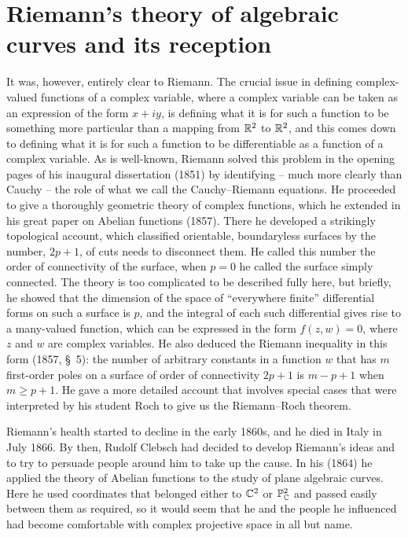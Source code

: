 \section{Riemann's theory of algebraic curves and its reception}
It was, however, entirely clear to Riemann. The crucial issue in defining complex-valued functions of a complex variable, where a complex variable can be taken as an expression of the form $x+ iy$, is defining what it is for such a function to be something more particular than a mapping from $\RR^2$ to $\RR^2$, and this comes down to defining what it is for such a function to be differentiable as a function of a complex variable. As is well-known, Riemann solved this problem in the opening pages of his inaugural dissertation  (1851) by identifying -- much more clearly than Cauchy -- the role of what we call the Cauchy--Riemann equations. He proceeded to give a thoroughly geometric theory of complex functions, which he extended in his great paper on Abelian functions (1857). There he developed a strikingly topological account, which classified orientable, boundaryless surfaces by the number, $2p+1$, of cuts needs to disconnect them. He called this number the order of connectivity of the surface, when $p=0$ he called the surface simply connected. The theory is too complicated to be described fully here, but briefly, he showed that  the dimension of the space of ``everywhere finite'' differential forms on such a surface is $p$, and the integral of each such 
differential gives rise to a many-valued function, which can be expressed in the form $f(z, w) = 0$, where $z$ and $w$ are complex variables. He also deduced the Riemann inequality in this form (1857, \S\, 5):  the number of arbitrary constants in a function $w$ that has $m$ first-order poles on a surface of order of connectivity $2p+1$ is $m- p + 1$ when $m \geq p + 1$. He gave a more detailed account that involves special cases that were interpreted by his student Roch to give us the Riemann--Roch theorem. 

Riemann's health started to decline in the early 1860s, and he  died in Italy in July 1866. By then, Rudolf Clebsch had decided to develop Riemann's ideas and to try to persuade people around him to take up the cause. In his (1864) he  applied the theory of Abelian functions to the study of plane algebraic curves. Here he used coordinates that belonged  either to $\CC^2$ or $\PP_\CC^2$ and  passed easily between them as required, so it would seem that he and the people he influenced had become comfortable with complex projective space in all but name.

